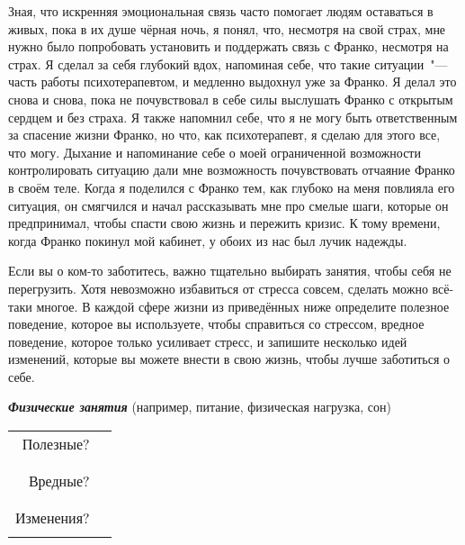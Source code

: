 Зная, что искренняя эмоциональная связь часто помогает людям оставаться в живых, пока в их душе чёрная ночь, я понял, что, несмотря на свой страх, мне нужно было попробовать установить и поддержать связь с Франко, несмотря на страх. Я сделал за себя глубокий вдох, напоминая себе, что такие ситуации~"--- часть работы психотерапевтом, и медленно выдохнул уже за Франко. Я делал это снова и снова, пока не почувствовал в себе силы выслушать Франко с открытым сердцем и без страха. Я также напомнил себе, что я не могу быть ответственным за спасение жизни Франко, но что, как психотерапевт, я сделаю для этого все, что могу. Дыхание и напоминание себе о моей ограниченной возможности контролировать ситуацию дали мне возможность почувствовать отчаяние Франко в своём теле. Когда я поделился с Франко тем, как глубоко на меня повлияла его ситуация, он смягчился и начал рассказывать мне про смелые шаги, которые он предпринимал, чтобы спасти свою жизнь и пережить кризис. К тому времени, когда Франко покинул мой кабинет, у обоих из нас был лучик надежды.

\newpage
{} \label{Ex:Reducing_Stress_for_Caregivers}

Если вы о ком-то заботитесь, важно тщательно выбирать занятия, чтобы себя не перегрузить. Хотя невозможно избавиться от стресса совсем, сделать можно всё-таки многое. В каждой сфере жизни из приведённых ниже определите полезное поведение, которое вы используете, чтобы справиться со стрессом, вредное поведение, которое только усиливает стресс, и запишите несколько идей изменений, которые вы можете внести в свою жизнь, чтобы лучше заботиться о себе.

\vspace{5ex}

\noindent\textbf{\emph{Физические занятия}} (например, питание, физическая нагрузка, сон)

\vspace{2ex}

\noindent
\setlength{\extrarowheight}{2mm}
\begin{tabular*}{\textwidth}{rp{11.7cm}}
	Полезные? & \\ \cline{2-2}
	  & \\ \cline{2-2}
	  \\
	Вредные? & \\ \cline{2-2}
	  & \\ \cline{2-2}
	  \\
	Изменения? & \\ \cline{2-2}
	  & \\ \cline{2-2}
\end{tabular*}
\setlength{\extrarowheight}{0mm}

